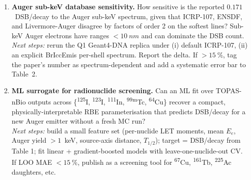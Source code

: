 \begin{enumerate}
\item \textbf{Auger sub-keV database sensitivity.}
How sensitive is the reported $0.171$~DSB/decay to the Auger sub-keV
spectrum, given that ICRP-107, ENSDF, and Livermore-Auger disagree by
factors of order 2 on the softest lines?  Sub-keV Auger electrons have
ranges $<\SI{10}{nm}$ and can dominate the DSB count.\\
\emph{Next steps:} rerun the Q1 Geant4-DNA replica under (i) default ICRP-107,
(ii) an explicit BrIccEmis per-shell spectrum.  Report the delta.  If
$>\SI{15}{\percent}$, tag the paper's number as spectrum-dependent and add a
systematic error bar to Table~2.

\item \textbf{ML surrogate for radionuclide screening.}
Can an ML fit over TOPAS-nBio outputs across
\{\textsuperscript{125}I, \textsuperscript{123}I, \textsuperscript{111}In,
\textsuperscript{99m}Tc, \textsuperscript{64}Cu\} recover a compact,
physically-interpretable RBE parameterisation that predicts DSB/decay for
a new Auger emitter without a fresh MC run?\\
\emph{Next steps:} build a small feature set (per-nuclide LET moments, mean
$E_e$, Auger yield $>1$~keV, source-axis distance, $T_{1/2}$); target =
DSB/decay from Table 1; fit linear + gradient-boosted models with
leave-one-nuclide-out CV.  If LOO MAE $<\SI{15}{\percent}$, publish as a
screening tool for \textsuperscript{67}Cu, \textsuperscript{161}Tb,
\textsuperscript{225}Ac daughters, etc.

\end{enumerate}
